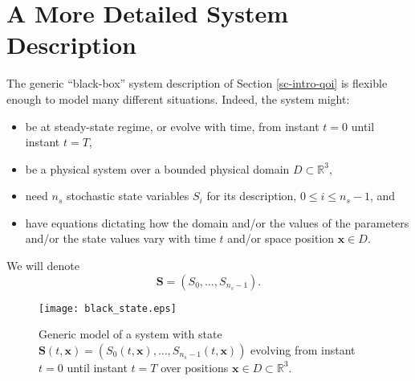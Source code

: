 \section{A More Detailed System Description}\label{sc-intro-detail}

The generic ``black-box'' system description of Section \ref{sc-intro-qoi} is flexible enough to model many different situations. Indeed, the system might:
\begin{itemize}
\item be at steady-state regime, or evolve with time, from instant $t=0$ until instant $t=T$,
\item be a physical system over a bounded physical domain $D\subset\mathbb{R}^3$,
\item need $n_{s}$ stochastic state variables $S_i$ for its description, $0\leqslant i\leqslant n_{s}-1$, and
\item have equations dictating how the domain and/or the values of the parameters and/or the state values vary with time $t$ and/or space position $\mathbf{x}\in D$.
\end{itemize}
We will denote
\begin{equation*}
\mathbf{S} = (S_0,\ldots,S_{n_s-1}).
\end{equation*}

\begin{figure}%
\begin{center}
\texttt{[image: black\_state.eps]}
\end{center}
\caption{Generic model of a system with state $\mathbf{S}(t,\mathbf{x}) = (S_0(t,\mathbf{x}),\ldots,S_{n_s-1}(t,\mathbf{x}))$
evolving from instant $t=0$ until instant $t=T$
over positions $\mathbf{x}\in D\subset\mathbb{R}^3$.
}
\label{fig-state-model}
\end{figure}

